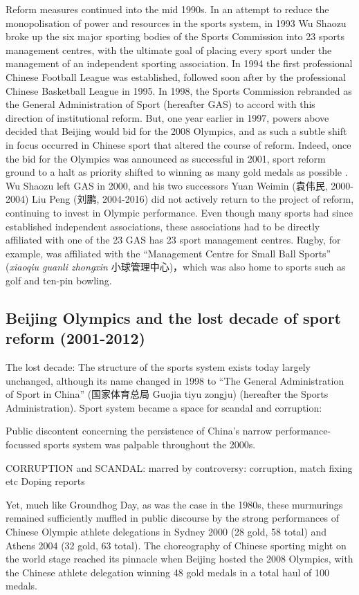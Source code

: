Reform measures continued into the mid 1990s. In an attempt to reduce the monopolisation of power and resources in the sports system, in 1993 Wu Shaozu broke up the six major sporting bodies of the Sports Commission into 23 sports management centres, with the ultimate goal of placing every sport under the management of an independent sporting association. In 1994 the first professional Chinese Football League was established, followed soon after by the professional Chinese Basketball League in 1995. In 1998, the Sports Commission rebranded as the General Administration of Sport (hereafter GAS) to accord with this direction of institutional reform.  But, one year earlier in 1997, powers above decided that Beijing would bid for the 2008 Olympics, and as such a subtle shift in focus occurred in Chinese sport that altered the course of reform.  Indeed, once the bid for the Olympics was announced as successful in 2001, sport reform ground to a halt as priority shifted to winning as many gold medals as possible \citep{News2017}.  Wu Shaozu left GAS in 2000, and his two successors Yuan Weimin (袁伟民, 2000-2004) Liu Peng (刘鹏, 2004-2016) did not actively return to the project of reform, continuing to invest in Olympic performance.  Even though many sports had since established independent associations, these associations had to be directly affiliated with one of the 23 GAS has 23 sport management centres. Rugby, for example, was affiliated with the ``Management Centre for Small Ball Sports'' (\textit{xiaoqiu guanli zhongxin} 小球管理中心)，which was also home to sports such as golf and ten-pin bowling.

\subsection{Beijing Olympics and the lost decade of sport reform (2001-2012)}
    The lost decade:
    The structure of the sports system exists today largely unchanged, although its name changed in 1998 to “The General Administration of Sport in China” (国家体育总局 Guojia tiyu zongju) (hereafter the Sports Administration).
    Sport system became a space for scandal and corruption:

    Public discontent concerning the persistence of China's narrow performance-focussed sports system was palpable throughout the 2000s.

    CORRUPTION and SCANDAL:
    marred by controversy:
    corruption, match fixing etc
    Doping reports

    Yet, much like Groundhog Day, as was the case in the 1980s, these murmurings remained sufficiently muffled in public discourse by the strong performances of Chinese Olympic athlete delegations in Sydney 2000 (28 gold, 58 total) and Athens 2004 (32 gold, 63 total). The choreography of Chinese sporting might on the world stage reached its pinnacle when Beijing hosted the 2008 Olympics, with the Chinese athlete delegation winning 48 gold medals in a total haul of 100 medals.

